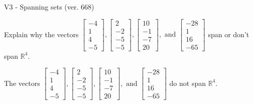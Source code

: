 \begin{exercise}
  \begin{exerciseTitle}V3 - Spanning sets (ver. 668)\end{exerciseTitle}
  \begin{exerciseStatement}
    Explain why the vectors \(\left[\begin{array}{r}
-4 \\
1 \\
4 \\
-5
\end{array}\right] , \left[\begin{array}{r}
2 \\
-2 \\
-5 \\
-5
\end{array}\right] , \left[\begin{array}{r}
10 \\
-1 \\
-7 \\
20
\end{array}\right] , \text{ and } \left[\begin{array}{r}
-28 \\
1 \\
16 \\
-65
\end{array}\right]\) span or don't span \(\mathbb{R}^4\). 
	


  \end{exerciseStatement}
  \begin{exerciseAnswer}
   The vectors \(\left[\begin{array}{r}
-4 \\
1 \\
4 \\
-5
\end{array}\right] , \left[\begin{array}{r}
2 \\
-2 \\
-5 \\
-5
\end{array}\right] , \left[\begin{array}{r}
10 \\
-1 \\
-7 \\
20
\end{array}\right] , \text{ and } \left[\begin{array}{r}
-28 \\
1 \\
16 \\
-65
\end{array}\right]\) 
  	 do not  
	span \(\mathbb{R}^4\).
  


  \end{exerciseAnswer}
\end{exercise}